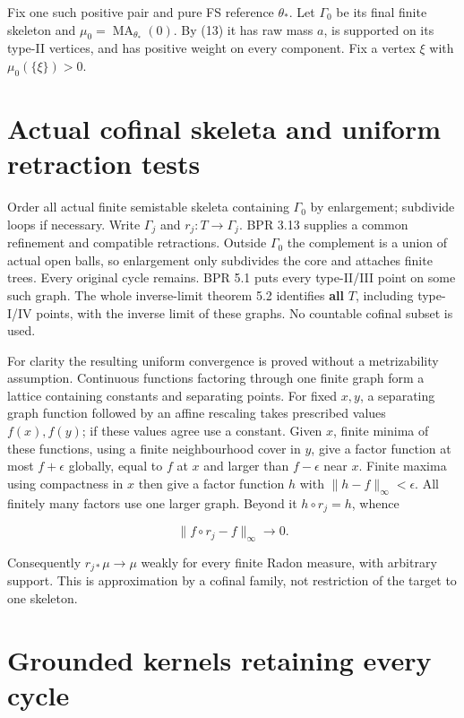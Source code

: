 \documentclass[
  11pt,
]{article}
\begin{document}
Fix one such positive pair and pure FS reference \(\theta_*\). Let
\(\Gamma_0\) be its final finite skeleton and
\(\mu_0=\operatorname{MA}_{\theta_*}(0)\). By (13) it has raw mass
\(a\), is supported on its type-II vertices, and has positive weight on
every component. Fix a vertex \(\xi\) with \(\mu_0(\{\xi\})>0\).

\section{Actual cofinal skeleta and uniform retraction
tests}\label{actual-cofinal-skeleta-and-uniform-retraction-tests}

Order all actual finite semistable skeleta containing \(\Gamma_0\) by
enlargement; subdivide loops if necessary. Write \(\Gamma_j\) and
\(r_j:T\to\Gamma_j\). BPR 3.13 supplies a common refinement and
compatible retractions. Outside \(\Gamma_0\) the complement is a union
of actual open balls, so enlargement only subdivides the core and
attaches finite trees. Every original cycle remains. BPR 5.1 puts every
type-II/III point on some such graph. The whole inverse-limit theorem
5.2 identifies \textbf{all} \(T\), including type-I/IV points, with the
inverse limit of these graphs. No countable cofinal subset is used.

For clarity the resulting uniform convergence is proved without a
metrizability assumption. Continuous functions factoring through one
finite graph form a lattice containing constants and separating points.
For fixed \(x,y\), a separating graph function followed by an affine
rescaling takes prescribed values \(f(x),f(y)\); if these values agree
use a constant. Given \(x\), finite minima of these functions, using a
finite neighbourhood cover in \(y\), give a factor function at most
\(f+\epsilon\) globally, equal to \(f\) at \(x\) and larger than
\(f-\epsilon\) near \(x\). Finite maxima using compactness in \(x\) then
give a factor function \(h\) with \(\|h-f\|_\infty<\epsilon\). All
finitely many factors use one larger graph. Beyond it \(h\circ r_j=h\),
whence

\[
                 \|f\circ r_j-f\|_\infty\longrightarrow0.         \tag{14}
\]

Consequently \(r_{j*}\mu\to\mu\) weakly for every finite Radon measure,
with arbitrary support. This is approximation by a cofinal family, not
restriction of the target to one skeleton.

\section{Grounded kernels retaining every
cycle}\label{grounded-kernels-retaining-every-cycle}
\end{document}
